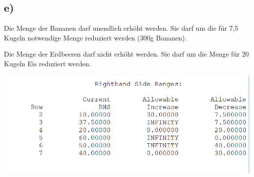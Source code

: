 \documentclass[a4paper,11pt]{article}
\begin{document}
\subsection*{e)}

Die Menge der Bananen darf unendlich erhöht werden. Sie darf um die für 7,5 Kugeln notwendige Menge reduziert werden (300g Bananen). \newline

Die Menge der Erdbeeren darf nicht erhöht werden. Sie darf um die Menge für 20 Kugeln Eis reduziert werden.

\includegraphics[width=.8\linewidth]{src/restriktionen.png}
\end{document}
